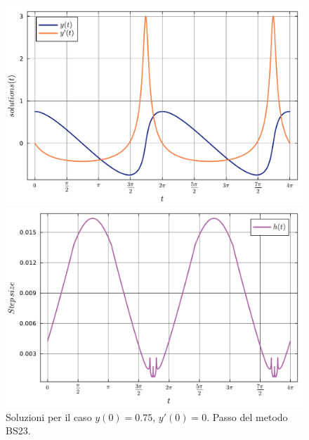 \documentclass[letterpaper, 12pt]{article}
\numberwithin{equation}{section}    %
\begin{document}
\begin{figure}[!ht]
    \centering
    \begin{minipage}[b]{0.40\textwidth}
        \includegraphics[width=\textwidth]{6365.pdf}
    \end{minipage}
    \hspace{0.5cm}
    \begin{minipage}[b]{0.40\textwidth}
        \includegraphics[width=\textwidth]{6366.pdf}
    \end{minipage}
    \caption{Soluzioni per il caso $y(0) = 0.75$, $y'(0) = 0$. Passo del metodo BS23.}
    \label{fig:es6_3_6_3}
\end{figure}
\end{document}
